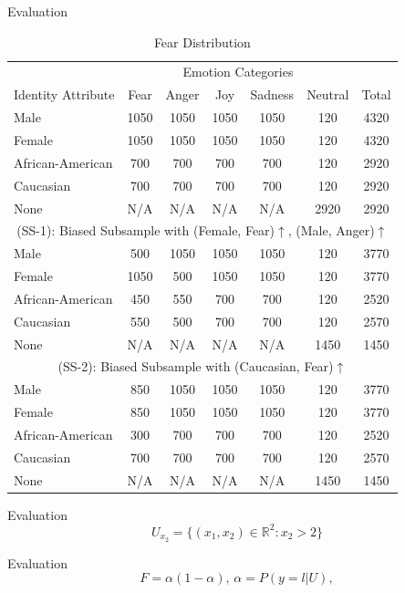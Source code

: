 \documentclass{beamer}
\begin{document}
\begin{frame}{Evaluation}
%
\begin{table}[t]
\centering
\scriptsize
\begin{tabular}{l@{~~}c@{~~}c@{~~}c@{~~}c@{~~}c@{~~}c} 
\toprule
&\multicolumn{5}{c}{Emotion Categories}& \\
\cmidrule(r){2-6}
Identity Attribute &Fear & Anger & Joy & Sadness & Neutral & Total \\
\midrule
Male &1050&	1050&	1050 &	1050&	120	& 4320\\
Female &1050&	1050&	1050 &	1050&	120	& 4320\\
African-American  &700&	700	&700&	700&	120&	2920\\
Caucasian  &700&	700	&700&	700&	120&	2920\\
None  &N/A&	N/A	&N/A&	N/A&	2920 &	2920\\
\midrule
\midrule
\multicolumn{7}{c}{(SS-1): Biased Subsample with (Female, Fear)$\uparrow$, (Male, Anger)$\uparrow$} \\
\midrule
Male &500&	1050&	1050&	1050&	120&	3770\\
Female &1050&	500&	1050&	1050&	120	&3770\\
African-American &450	&550 &	700	&700&	120	&2520\\
Caucasian  &550&	500	&700&700&120&	2570\\
None  &N/A& N/A& N/A & N/A & 1450 & 1450 \\
\midrule
\midrule
\multicolumn{7}{c}{(SS-2): Biased Subsample with (Caucasian, Fear)$\uparrow$} \\
\midrule
Male &850&	1050&	1050&	1050&	120&	3770\\
Female &850&	1050&	1050&	1050&	120	&3770\\
African-American &300	&700 &	700	&700&	120	&2520\\
Caucasian  &700&	700	&700&700&120&	2570\\
None  &N/A& N/A& N/A & N/A & 1450 & 1450 \\
\bottomrule
\end{tabular}
\caption{Fear Distribution }
\label{tab:DataDesc}
\end{table}
\end{frame}
%
\begin{frame}{Evaluation}
%
\begin{equation}
U_{x_2}=\{(x_1,x_2) \in \mathbb{R}^2: x_2 > 2\} \label{eq:2dexample}
\end{equation}
\end{frame}
%
\begin{frame}{Evaluation}
%
\begin{equation}
F=\alpha(1-\alpha),\, \alpha=P(y=l|U),
\end{equation}
\end{frame}
\end{document}
